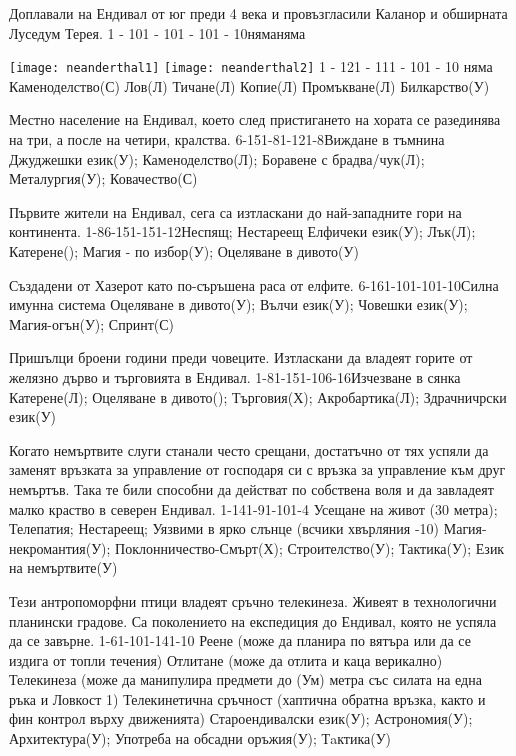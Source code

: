 \begin{multicols}{2}
{Доплавали на Ендивал от юг преди 4 века и провъзгласили Каланор и обширната Луседум Терея.}
{1 - 10}{1 - 10}{1 - 10}{1 - 10}{няма}{няма}

\texttt{[image: neanderthal1]}
\texttt{[image: neanderthal2]}
{}
{1 - 12}{1 - 11}{1 - 10}{1 - 10}
{няма}
{
Каменоделство(С)
Лов(Л)
Тичане(Л)
Копие(Л)
Промъкване(Л)
Билкарство(У)
}

{Местно население на Ендивал, което след пристигането на хората се разединява на три, а после на четири, кралства.}
{6-15}{1-8}{1-12}{1-8}{Виждане в тъмнина}
{
Джуджешки език(У);
Каменоделство(Л);
Боравене с брадва/чук(Л);
Металургия(У);
Ковачество(С)
}

{Първите жители на Ендивал, сега са изтласкани до най-западните гори на континента.}
{1-8}{6-15}{1-15}{1-12}{Неспящ; Нестареещ}
{
Елфичеки език(У);
Лък(Л);
Катерене();
Магия - по избор(У);
Оцеляване в дивото(У)
}

{Създадени от Хазерот като по-съръшена раса от елфите.}
{6-16}{1-10}{1-10}{1-10}{Силна имунна система}
{
Оцеляване в дивото(У);
Вълчи език(У);
Човешки език(У);
Магия-огън(У);
Спринт(С)
}

{Пришълци броени години преди човеците. Изтласкани да владеят горите от желязно дърво и търговията в Ендивал.}
{1-8}{1-15}{1-10}{6-16}{Изчезване в сянка}
{
Катерене(Л);
Оцеляване в дивото();
Търговия(Х);
Акробартика(Л);
Здрачничрски език(У)
}

{Когато немъртвите слуги станали често срещани, достатъчно от тях успяли да заменят връзката за управление от господаря си с връзка за управление към друг немъртъв.
Така те били способни да действат по собствена воля и да завладеят малко краство в северен Ендивал.}
{1-14}{1-9}{1-10}{1-4}
{
Усещане на живот (30 метра);
Телепатия;
Нестареещ;
Уязвими в ярко слънце (всчики хвърляния -10)
}
{
Магия-некромантия(У);
Поклонничество-Смърт(Х);
Строителство(У);
Тактика(У); %
Език на немъртвите(У)
}

{Тези антропоморфни птици владеят сръчно телекинеза.
Живеят в технологични планински градове.
Са поколението на експедиция до Ендивал, която не успяла да се завърне.}
{1-6}{1-10}{1-14}{1-10}
{
Реене (може да планира по вятъра или да се издига от топли течения)
Отлитане (може да отлита и каца верикално)
Телекинеза (може да манипулира предмети до (Ум) метра със силата на една ръка и Ловкост 1)
Телекинетична сръчност (хаптична обратна връзка, както и фин контрол върху движенията)
}
{
Староендивалски език(У);
Астрономия(У);
Архитектура(У);
Употреба на обсадни оръжия(У);
Тaктика(У)
}


\end{multicols}
